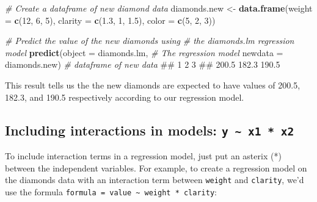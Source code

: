 \documentclass[]{book}
\newenvironment{Shaded}{\begin{snugshade}}{\end{snugshade}}
\newcommand{\KeywordTok}[1]{\textcolor[rgb]{0.13,0.29,0.53}{\textbf{#1}}}
\newcommand{\DataTypeTok}[1]{\textcolor[rgb]{0.13,0.29,0.53}{#1}}
\newcommand{\DecValTok}[1]{\textcolor[rgb]{0.00,0.00,0.81}{#1}}
\newcommand{\FloatTok}[1]{\textcolor[rgb]{0.00,0.00,0.81}{#1}}
\newcommand{\StringTok}[1]{\textcolor[rgb]{0.31,0.60,0.02}{#1}}
\newcommand{\CommentTok}[1]{\textcolor[rgb]{0.56,0.35,0.01}{\textit{#1}}}
\newcommand{\NormalTok}[1]{#1}
\theoremstyle{definition}
\theoremstyle{definition}
\theoremstyle{remark}
\begin{document}
\begin{Shaded}
\begin{Highlighting}[]
\CommentTok{# Create a dataframe of new diamond data}
\NormalTok{diamonds.new <-}\StringTok{ }\KeywordTok{data.frame}\NormalTok{(}\DataTypeTok{weight =} \KeywordTok{c}\NormalTok{(}\DecValTok{12}\NormalTok{, }\DecValTok{6}\NormalTok{, }\DecValTok{5}\NormalTok{),}
                           \DataTypeTok{clarity =} \KeywordTok{c}\NormalTok{(}\FloatTok{1.3}\NormalTok{, }\DecValTok{1}\NormalTok{, }\FloatTok{1.5}\NormalTok{),}
                           \DataTypeTok{color =} \KeywordTok{c}\NormalTok{(}\DecValTok{5}\NormalTok{, }\DecValTok{2}\NormalTok{, }\DecValTok{3}\NormalTok{))}

\CommentTok{# Predict the value of the new diamonds using}
\CommentTok{#  the diamonds.lm regression model}
\KeywordTok{predict}\NormalTok{(}\DataTypeTok{object =}\NormalTok{ diamonds.lm,     }\CommentTok{# The regression model}
        \DataTypeTok{newdata =}\NormalTok{ diamonds.new)   }\CommentTok{# dataframe of new data}
\NormalTok{##     1     2     3 }
\NormalTok{## 200.5 182.3 190.5}
\end{Highlighting}
\end{Shaded}

This result tells us the the new diamonds are expected to have values of
200.5, 182.3, and 190.5 respectively according to our regression model.

\subsection{\texorpdfstring{Including interactions in models:
\texttt{y\ \textasciitilde{}\ x1\ *\ x2}}{Including interactions in models: y \textasciitilde{} x1 * x2}}\label{including-interactions-in-models-y-x1-x2}

To include interaction terms in a regression model, just put an asterix
(*) between the independent variables. For example, to create a
regression model on the diamonds data with an interaction term between
\texttt{weight} and \texttt{clarity}, we'd use the formula
\texttt{formula\ =\ value\ \textasciitilde{}\ weight\ *\ clarity}:
\end{document}
